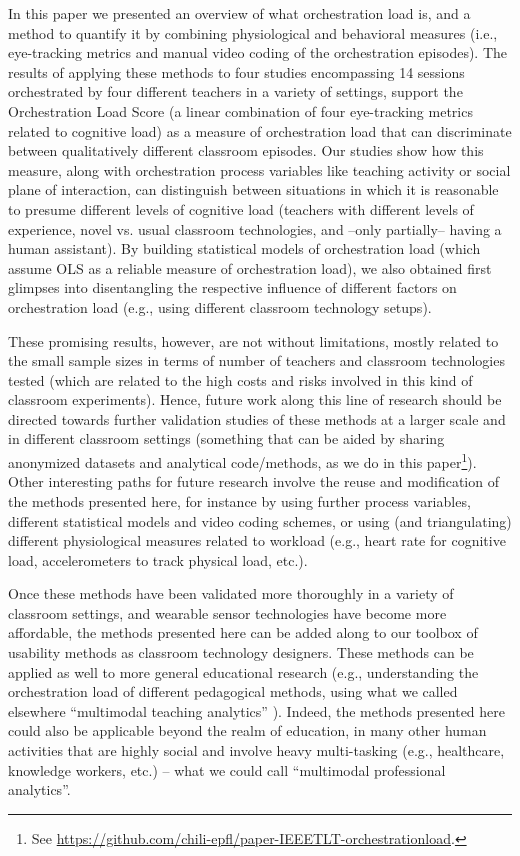 \documentclass[10pt,journal,compsoc]{IEEEtran}
\begin{document}
In this paper we presented an overview of what orchestration load is, and a method to quantify it by combining physiological and behavioral measures (i.e., eye-tracking metrics and manual video coding of the orchestration episodes). The results of applying these methods to four studies encompassing 14 sessions orchestrated by four different teachers in a variety of settings, support the Orchestration Load Score (a linear combination of four eye-tracking metrics related to cognitive load) as a measure of orchestration load that can discriminate between qualitatively different classroom episodes. Our studies show how this measure, along with orchestration process variables like teaching activity or social plane of interaction, can distinguish between situations in which it is reasonable to presume different levels of cognitive load (teachers with different levels of experience, novel vs. usual classroom technologies, and --only partially-- having a human assistant). By building statistical models of orchestration load (which assume OLS as a reliable measure of orchestration load), we also obtained first glimpses into disentangling the respective influence of different factors on orchestration load (e.g., using different classroom technology setups).

These promising results, however, are not without limitations, mostly related to the small sample sizes in terms of number of teachers and classroom technologies tested (which are related to the high costs and risks involved in this kind of classroom experiments). Hence, future work along this line of research should be directed towards further validation studies of these methods at a larger scale and in different classroom settings (something that can be aided by sharing anonymized datasets and analytical code/methods, as we do in this paper\footnote{See \href{https://github.com/chili-epfl/paper-IEEETLT-orchestrationload}{https://github.com/chili-epfl/paper-IEEETLT-orchestrationload}.}). Other interesting paths for future research involve the reuse and modification of the methods presented here, for instance by using further process variables, different statistical models and video coding schemes, or using (and triangulating) different physiological measures related to workload (e.g., heart rate for cognitive load, accelerometers to track physical load, etc.).

Once these methods have been validated more thoroughly in a variety of classroom settings, and wearable sensor technologies have become more affordable, the methods presented here can be added along to our toolbox of usability methods as classroom technology designers. These methods can be applied as well to more general educational research (e.g., understanding the orchestration load of different pedagogical methods, using what we called elsewhere ``multimodal teaching analytics'' \cite{prieto2016teaching}). Indeed, the methods presented here could also be applicable beyond the realm of education, in many other human activities that are highly social and involve heavy multi-tasking (e.g., healthcare, knowledge workers, etc.) -- what we could call ``multimodal professional analytics''.
\end{document}
